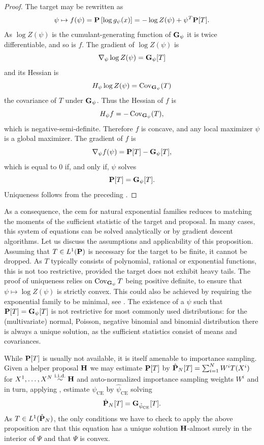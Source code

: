 \begin{proof}
    The target may be rewritten as
    $$
    \psi \mapsto f(\psi) = \P \left[\log g_{\psi}(x)\right]= -\log Z(\psi) + \psi^{T} \P [T].
    $$
    As $\log Z(\psi)$ is the cumulant-generating function of $\G_{\psi}$ it is twice differentiable, and so is $f$. The gradient of $\log Z(\psi)$ is 
    $$
    \nabla_{\psi} \log Z(\psi) = \G_{\psi} [T]
    $$
    and its Hessian is 
    $$
    H_{\psi} \log Z(\psi) = \cov_{\G_{\psi}} (T)
    $$
    the covariance of $T$ under $\G_{\psi}$. Thus the Hessian of $f$ is 
    $$
    H_{\psi} f = - \cov_{\G_{\psi}} (T),
    $$
    which is negative-semi-definite. Therefore $f$ is concave, and any local maximizer $\psi$ is a global maximizer. The gradient of $f$ is 
    $$
        \nabla_{\psi} f(\psi) = \P[T] - \G_{\psi} [T],
    $$
    which is equal to $0$ if, and only if, $\psi$ solves 
    $$
    \P[T] = \G_{\psi}[T].
    $$
    Uniqueness follows from the preceding .
\end{proof}
As a consequence, the \gls{cem} for natural exponential families reduces to matching the moments of the sufficient statistic of the target and proposal.
In many cases, this system of equations can be solved analytically or by gradient descent algorithms.
Let us discuss the assumptions and applicability of this proposition. Assuming that $T \in L^{1}(\P)$ is necessary for the target to be finite, it cannot be dropped. As $T$ typically consists of polynomial, rational or exponential functions, this is not too restrictive, provided the target does not exhibit heavy tails. The proof of uniqueness relies on $\cov_{\G_{\psi}} T$ being positive definite, to ensure that $\psi \mapsto \log Z(\psi)$ is strictly convex. This could also be achieved by requiring the exponential family to be minimal, see \citep[Theorem 1.13 (iv)]{Brown1986Fundamentals}. The existence of a $\psi$ such that $\P [T] = \G_{\psi} [T]$ is not restrictive for most commonly used distributions: for the (multivariate) normal, Poisson, negative binomial and binomial distribution there is always a unique solution, as the sufficient statistics consist of means and covariances. 

While $\P [T]$ is usually not available, it is itself amenable to importance sampling. Given a helper proposal $\H$ we may estimate $\P [T]$ by $\hat\P_N [T] = \sum_{i = 1}^{N} W^{i} T(X^{i})$ for $X^{1}, \dots, X^{N} \iid \H$ and auto-normalized importance sampling weights $W^{i}$ and in turn, applying , estimate $\psi_{\text{CE}}$ by $\hat \psi_{\text{CE}}$ solving
\begin{equation}
    \label{eq:ee_hpce}
\hat \P_N [T] = \G_{\hpce} [T].
\end{equation}
As $T \in L^{1}(\hat \P_{N})$, the only conditions we have to check to apply the above proposition are that this equation has a unique solution $\H$-almost surely in the interior of $\Psi$ and that $\Psi$ is convex. 

